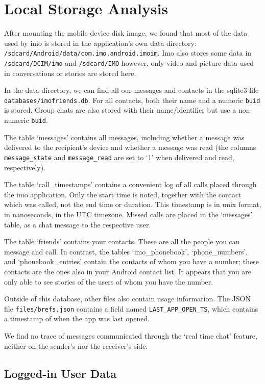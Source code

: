 \documentclass[conference]{IEEEtran}
\begin{document}
\section{Local Storage Analysis}\label{sec:storage}

After mounting the mobile device disk image, we found that most of the data used
by imo is stored in the application's own data directory:
\texttt{/sdcard/Android/data/com.imo.android.imoim}. Imo also stores some data
in \texttt{/sdcard/DCIM/imo} and \texttt{/sdcard/IMO} however, only video and
picture data used in conversations or stories are stored here.

In the data directory, we can find all our messages and contacts in the sqlite3
file \texttt{databases/imofriends.db}. For all contacts, both their name and a
numeric \texttt{buid} is stored. Group chats are also stored with their
name/identifier but use a non-numeric \texttt{buid}.

The table `messages' contains all messages, including whether a message was
delivered to the recipient's device and whether a message was read (the columns
\texttt{message\_state} and \texttt{message\_read} are set to `1' when
delivered and read, respectively).

The table `call\_timestamps' contains a convenient log of all calls placed
through the imo application. Only the start time is noted, together with the
contact which was called, not the end time or duration. This timestamp is in
unix format, in nanoseconds, in the UTC timezone. Missed calls are placed in
the `messages' table, as a chat message to the respective user.

The table `friends' contains your contacts. These are all the people you can
message and call. In contrast, the tables `imo\_phonebook', `phone\_numbers',
and `phonebook\_entries' contain the contacts of whom you have a number; these
contacts are the ones also in your Android contact list. It appears that you
are only able to see stories of the users of whom you have the number.

Outside of this database, other files also contain usage information. The JSON
file \texttt{files/brefs.json} contains a field named
\texttt{LAST\_APP\_OPEN\_TS}, which contains a timestamp of when the app was
last opened.

We find no trace of messages communicated through the `real time chat' feature,
neither on the sender's nor the receiver's side.


\subsection{Logged-in User Data}
\end{document}
